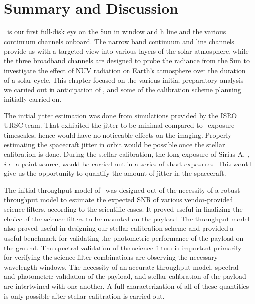 
\section{Summary and Discussion}\label{sec:c3_outlook}

\suit~is our first full-disk eye on the Sun in  window and  h line and the various continuum channels onboard. The narrow band continuum and line channels provide us with a targeted view into various layers of the solar atmosphere, while the three broadband channels are designed to probe the radiance from the Sun to investigate the effect of NUV radiation on Earth's atmosphere over the duration of a solar cycle. This chapter focused on the various initial preparatory analysis we carried out in anticipation of \suit, and some of the calibration scheme planning initially carried on.

The initial jitter estimation was done from simulations provided by the ISRO URSC team. That exhibited the jitter to be minimal compared to \suit~exposure timescales, hence would have no noticeable effects on the imaging. Properly estimating the spacecraft jitter in orbit would be possible once the stellar calibration is done. During the stellar calibration, the long exposure of Sirius-A, {\it, i.e.} a point source, would be carried out in a series of short exposures. This would give us the opportunity to quantify the amount of jitter in the spacecraft.

The initial throughput model of \suit~was designed out of the necessity of a robust throughput model to estimate the expected SNR of various vendor-provided science filters, according to the scientific cases. It proved useful in finalizing the choice of the science filters to be mounted on the payload. The throughput model also proved useful in designing our stellar calibration scheme and provided a useful benchmark for validating the photometric performance of the payload on the ground. The spectral validation of the science filters is important primarily for verifying the science filter combinations are observing the necessary wavelength windows. The necessity of an accurate throughput model, spectral and photometric validation of the payload, and stellar calibration of the payload are intertwined with one another. A full characterization of all of these quantities is only possible after stellar calibration is carried out. 